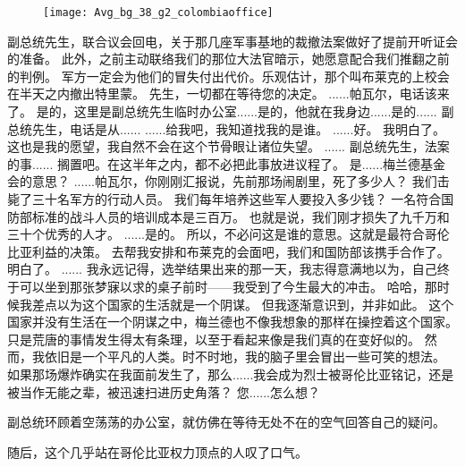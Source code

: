 \documentclass[openany]{book}
\begin{document}
\begin{figure}[h]
    \centering
    \texttt{[image: Avg\_bg\_38\_g2\_colombiaoffice]}
\end{figure}
\begin{dialogue}
     副总统先生，联合议会回电，关于那几座军事基地的裁撤法案做好了提前开听证会的准备。
     此外，之前主动联络我们的那位大法官暗示，她愿意配合我们推翻之前的判例。
     军方一定会为他们的冒失付出代价。乐观估计，那个叫布莱克的上校会在半天之内撤出特里蒙。
     先生，一切都在等待您的决定。
     ......帕瓦尔，电话该来了。
     是的，这里是副总统先生临时办公室......是的，他就在我身边......是的......
     副总统先生，电话是从......
     ......给我吧，我知道找我的是谁。
     ......好。
     我明白了。这也是我的愿望，我自然不会在这个节骨眼让诸位失望。
     ......
     副总统先生，法案的事......
     搁置吧。在这半年之内，都不必把此事放进议程了。
     是......梅兰德基金会的意思？
     ......帕瓦尔，你刚刚汇报说，先前那场闹剧里，死了多少人？
     我们击毙了三十名军方的行动人员。
     我们每年培养这些军人要投入多少钱？
     一名符合国防部标准的战斗人员的培训成本是三百万。
     也就是说，我们刚才损失了九千万和三十个优秀的人才。
     ......是的。
     所以，不必问这是谁的意思。这就是最符合哥伦比亚利益的决策。
     去帮我安排和布莱克的会面吧，我们和国防部该携手合作了。
     明白了。
     ......
     我永远记得，选举结果出来的那一天，我志得意满地以为，自己终于可以坐到那张梦寐以求的桌子前时——我受到了今生最大的冲击。
     哈哈，那时候我差点以为这个国家的生活就是一个阴谋。
     但我逐渐意识到，并非如此。
     这个国家并没有生活在一个阴谋之中，梅兰德也不像我想象的那样在操控着这个国家。
     只是荒唐的事情发生得太有条理，以至于看起来像是我们真的在变好似的。
     然而，我依旧是一个平凡的人类。时不时地，我的脑子里会冒出一些可笑的想法。
     如果那场爆炸确实在我面前发生了，那么......我会成为烈士被哥伦比亚铭记，还是被当作无能之辈，被迅速扫进历史角落？
     您......怎么想？
\end{dialogue}\par

副总统环顾着空荡荡的办公室，就仿佛在等待无处不在的空气回答自己的疑问。\par
随后，这个几乎站在哥伦比亚权力顶点的人叹了口气。
\end{document}
